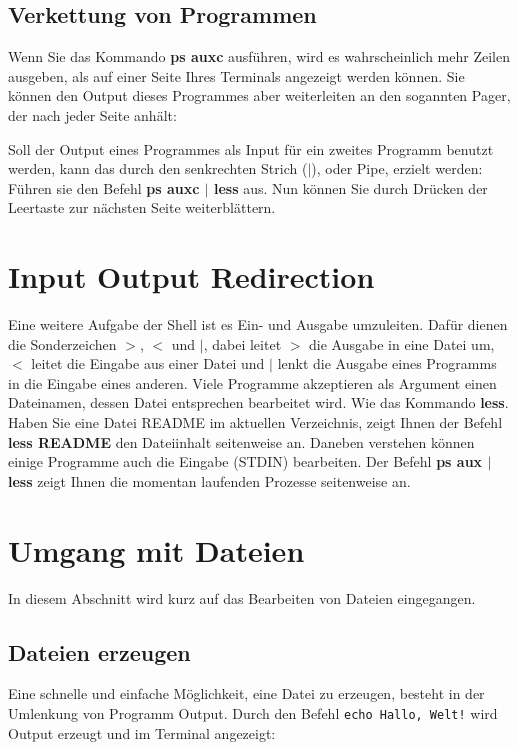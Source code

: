 \documentclass[titlepage,a4paper]{article}
\begin{document}
\subsection{Verkettung von Programmen}
\label{sec:verkettung}

Wenn Sie das Kommando \textbf{ps auxc} ausführen, wird es wahrscheinlich mehr
Zeilen ausgeben, als auf einer Seite Ihres Terminals angezeigt werden können.
Sie können den Output dieses Programmes aber weiterleiten an den sogannten
Pager, der nach jeder Seite anhält:

Soll der Output eines Programmes als Input für ein zweites Programm benutzt
werden, kann das durch den senkrechten Strich ($|$), oder Pipe, erzielt
werden: Führen sie den Befehl \textbf{ps auxc $|$ less} aus.  Nun können Sie
durch Drücken der Leertaste zur nächsten Seite weiterblättern.  

\section{Input Output Redirection}
\label{sec:io}

Eine weitere Aufgabe der Shell ist es Ein- und Ausgabe umzuleiten.  Dafür
dienen die Sonderzeichen $>$, $<$ und $|$, dabei leitet $>$ die Ausgabe in
eine Datei um, $<$ leitet die Eingabe aus einer Datei und $|$ lenkt die
Ausgabe eines Programms in die Eingabe eines anderen.  Viele Programme
akzeptieren als Argument einen Dateinamen, dessen Datei entsprechen bearbeitet
wird.  Wie das Kommando \textbf{less}.  Haben Sie eine Datei README im
aktuellen Verzeichnis, zeigt Ihnen der Befehl \textbf{less README} den
Dateiinhalt seitenweise an.  Daneben verstehen können einige Programme auch
die Eingabe (STDIN) bearbeiten.  Der Befehl \textbf{ps aux $|$ less} zeigt
Ihnen die momentan laufenden Prozesse seitenweise an.

\section{Umgang mit Dateien}
\label{sec:files}

In diesem Abschnitt wird kurz auf das Bearbeiten von Dateien eingegangen.

\subsection{Dateien erzeugen}
\label{sec:create}

Eine schnelle und einfache Möglichkeit, eine Datei zu erzeugen, besteht in der
Umlenkung von Programm Output.  Durch den Befehl \texttt{echo Hallo, Welt!}
wird Output erzeugt und im Terminal angezeigt:
\end{document}
